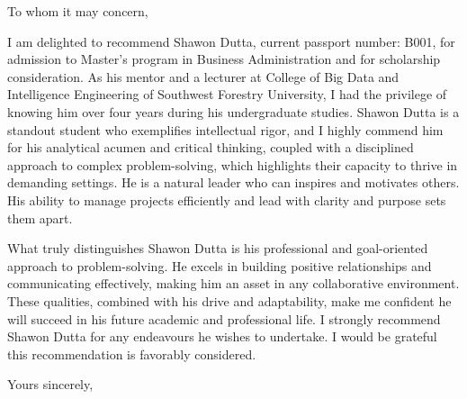 \documentclass[letter,12pt]{letter}
\begin{document}
\begin{letter}{}

  \address{WANG Xiaolin (Mr.)\\
    Lecturer,\\
    Southwest Forestry University,\\
    Kunming, China\\
    Email: \emph{wx672ster@swfu.edu.cn}\\
    Phone: 86+13577067397
  }
  \signature{WANG Xiaolin}
  \date{\today}

  \opening{To whom it may concern,}

  I am delighted to recommend Shawon Dutta, current passport number:
  B001, for admission to Master's program in Business
  Administration and for scholarship consideration. As his mentor and
  a lecturer at College of Big Data and Intelligence
  Engineering of Southwest Forestry University, I had the privilege of
  knowing him over four years during his undergraduate studies.
  Shawon Dutta is a standout student who exemplifies intellectual
  rigor, and I highly commend him for his analytical acumen and
  critical thinking, coupled with a disciplined approach to complex
  problem-solving, which highlights their capacity to thrive in
  demanding settings. He is a natural leader who can inspires and
  motivates others. His ability to manage projects efficiently and
  lead with clarity and purpose sets them apart.

  What truly distinguishes Shawon Dutta is his professional and
  goal-oriented approach to problem-solving. He excels in building
  positive relationships and communicating effectively, making him an
  asset in any collaborative environment. These qualities, combined
  with his drive and adaptability, make me confident he will succeed
  in his future academic and professional life.  I strongly recommend
  Shawon Dutta for any endeavours he wishes to undertake. I would be
  grateful this recommendation is favorably considered.

  \closing{Yours sincerely,}

\end{letter}
\end{document}
